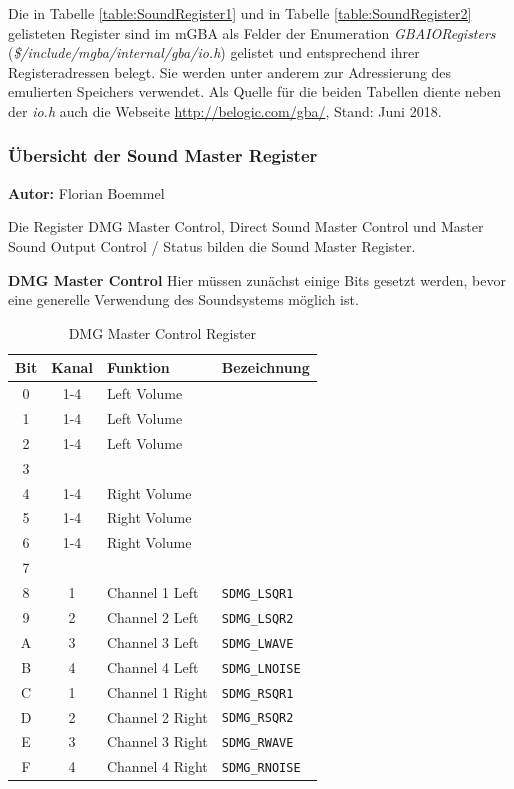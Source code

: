 \documentclass[11pt,a4paper]{scrartcl}
\newcommand{\AutorFlorian} {
    \vspace{-4mm}
    \large \textbf{Autor:} Florian Boemmel \normalsize
    \vspace{2mm}
}
\newcommand{\paratitle}[1] {
    \vspace{5mm}
    \large \textbf{#1} \normalsize
    \vspace{2mm}\newline
}
\begin{document}
Die in Tabelle \ref{table:SoundRegister1} und in Tabelle \ref{table:SoundRegister2} gelisteten Register sind im mGBA als Felder der Enumeration \textit{GBAIORegisters} (\textit{\$/include/mgba/internal/gba/io.h}) gelistet und entsprechend ihrer Registeradressen belegt. Sie werden unter anderem zur Adressierung des emulierten Speichers verwendet. Als Quelle f\"ur die beiden Tabellen diente neben der \textit{io.h} auch die Webseite \url{http://belogic.com/gba/}, Stand: Juni 2018.

\newpage


\subsubsection{\"Ubersicht der Sound Master Register}
\AutorFlorian

Die Register DMG Master Control, Direct Sound Master Control und Master Sound Output Control / Status bilden die Sound Master Register.

\paratitle{DMG Master Control} \label{dmgmastercontrol}
Hier m\"ussen zun\"achst einige Bits gesetzt werden, bevor eine generelle Verwendung des Soundsystems m\"oglich ist.

\begin{table}[h]
	\centering
    \begin{tabular}{ c | c | p{10cm} | l } 
	    \textbf{Bit} & \textbf{Kanal} & \textbf{Funktion} & \textbf{Bezeichnung} \\
	    \hline
	    0 & 1-4 & Left Volume & \\
	    \hline
	    1 & 1-4 & Left Volume & \\
	    \hline
	    2 & 1-4 & Left Volume & \\
	    \hline
	    3 & & & \\
	    \hline
	    4 & 1-4 & Right Volume & \\
	    \hline
	    5 & 1-4 & Right Volume & \\
	    \hline
	    6 & 1-4 & Right Volume & \\
	    \hline
	    7 & & & \\
	    \hline
	    8 & 1 & Channel 1 Left & \verb|SDMG_LSQR1| \\
	    \hline
	    9 & 2 & Channel 2 Left & \verb|SDMG_LSQR2| \\
	    \hline
	    A & 3 & Channel 3 Left & \verb|SDMG_LWAVE| \\
	    \hline
	    B & 4 & Channel 4 Left & \verb|SDMG_LNOISE| \\
	    \hline
	    C & 1 & Channel 1 Right & \verb|SDMG_RSQR1| \\
	    \hline
	    D & 2 & Channel 2 Right & \verb|SDMG_RSQR2| \\
	    \hline
	    E & 3 & Channel 3 Right & \verb|SDMG_RWAVE| \\
	    \hline
	    F & 4 & Channel 4 Right & \verb|SDMG_RNOISE| \\
	\end{tabular}
	\caption{DMG Master Control Register}
	\label{table:DmgMasterControlRegister}
\end{table}
\end{document}
